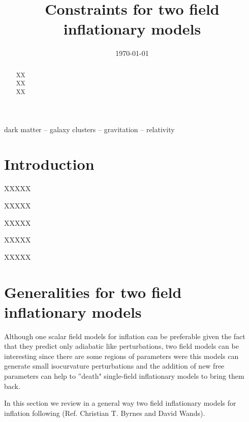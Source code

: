 \documentclass[a4paper,fleqn,usenatbib,useAMS]{mnras}
\begin{document}
\title{Constraints for two field inflationary models}


\date{\today}


\maketitle


\begin{abstract}
XX\\
XX\\
XX\\

\end{abstract}

\begin{keywords}
dark matter  -- galaxy clusters --  gravitation  -- relativity
\end{keywords}



\section{Introduction}
\label{introduction}

XXXXX

XXXXX

XXXXX

XXXXX

XXXXX

\section{Generalities for two field inflationary models}

Although one scalar field models for inflation can be preferable given the fact that they predict only adiabatic like perturbations, two field models can be interesting since there are some regions of parameters were this models can generate small isocurvature perturbations and the addition of new free parameters can help to ''death" single-field inflationary models to bring them back.  

In this section we review in a general way two field inflationary models for inflation following (Ref. Christian T. Byrnes and David Wands). 
\end{document}
